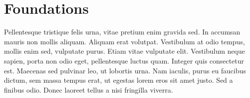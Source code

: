 \section{Foundations}\label{sec:foundations}
Pellentesque tristique felis urna, vitae pretium enim gravida sed.
In accumsan mauris non mollis aliquam.
Aliquam erat volutpat.
Vestibulum at odio tempus, mollis enim sed, vulputate purus.
Etiam vitae vulputate elit.
Vestibulum neque sapien, porta non odio eget, pellentesque luctus quam.
Integer quis consectetur est.
Maecenas sed pulvinar leo, ut lobortis urna.
Nam iaculis, purus eu faucibus dictum, sem massa tempus erat, ut egestas lorem eros sit amet justo.
Sed a finibus odio.
Donec laoreet tellus a nisi fringilla viverra.
